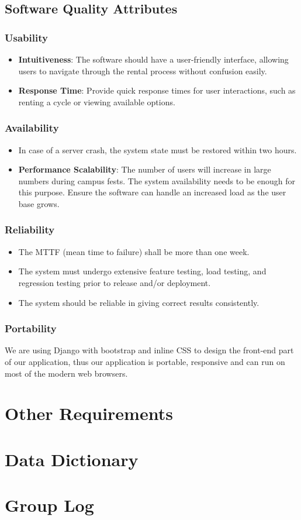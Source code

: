 \documentclass{scrreprt}
\begin{document}
\section{Software Quality Attributes}
\subsection{Usability}
\begin{itemize}
    \item \textbf{Intuitiveness}: The software should have a user-friendly interface, allowing users to navigate through the rental process without confusion easily.
    \item \textbf{Response Time}: Provide quick response times for user interactions, such as renting a cycle or viewing available options.
\end{itemize}

\subsection{Availability}
\begin{itemize}
    \item In case of a server crash, the system state must be restored within two hours.
    \item \textbf{Performance Scalability}: The number of users will increase in large numbers during campus fests. The system availability needs to be enough for this purpose. Ensure the software can handle an increased load as the user base grows.
\end{itemize}
\subsection{Reliability}
\begin{itemize}
    \item The MTTF (mean time to failure) shall be more than one week.
    \item The system must undergo extensive feature testing, load testing, and regression testing prior to release and/or deployment.
    \item The system should be reliable in giving correct results consistently.
\end{itemize}

\subsection{Portability}
We are using Django with bootstrap and inline CSS to design the front-end part of our application, thus our application is portable, responsive and can run on most of the modern web browsers.

\chapter{Other Requirements}

\begin{appendices}
\chapter{Data Dictionary}

\chapter{Group Log}
\end{appendices}
\end{document}
